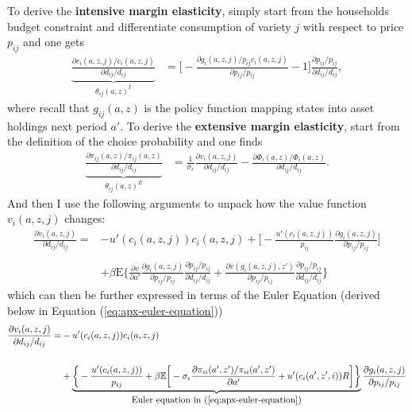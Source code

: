 \documentclass[12pt,pdftex]{article}
\begin{document}
\begin{onehalfspacing}
To derive the \textbf{intensive margin elasticity}, simply start from the households budget constraint and differentiate consumption of variety $j$ with respect to price $p_{ij}$ and one gets
\begin{align}
\underbrace{\frac{\partial c_{i}(a,z,j)/ c_{i}(a,z,j)}{\partial d_{ij} / d_{ij}}}_{\theta_{ij}(a,z)^{I}} &= \bigg [-\frac{\partial g_{i}(a,z,j)/ p_{ij}c_{i}(a,z,j)}{\partial p_{ij}/ p_{ij}} - 1 \bigg ]\frac{\partial p_{ij}/p_{ij}}{\partial d_{ij}/ d_{ij}} ,
\label{eq:apx-intensive-margin}
\end{align}
where recall that $g_{ij}(a,z)$ is the policy function mapping states into asset holdings next period $a'$. To derive the \textbf{extensive margin elasticity}, start from the definition of the choice probability and one finds
\begin{align}
\underbrace{ \frac{\partial \pi_{ij}(a,z) / \pi_{ij}(a,z)}{\partial d_{ij} / d_{ij}} }_{\theta_{ij}(a,z)^{E}} &= \frac{1}{\sigma_{\epsilon}}\frac{\partial v_{i}(a, z, j)}{\partial d_{ij}/d_{ij}} -  \frac{\partial \Phi_{i}(a,z) / \Phi_{i}(a,z)}{\partial d_{ij}/d_{ij}}.
\label{eq:apx-extensive-margin}
\end{align}
And then I use the following arguments to unpack how the value function $v_{i}(a, z, j)$ changes:
\begin{align}
\frac{\partial v_{i}(a,z,j)}{\partial d_{ij}/d_{ij}}  =& -u'(c_{i}(a,z,j))c_{i}(a,z,j) + \bigg [ -\frac{u'(c_{i}(a,z,j))}{p_{ij}}\frac{\partial g_{i}(a,z,j)}{\partial p_{ij}/ p_{ij}} \bigg ]  \\
\nonumber \\
&+ \beta \mathrm{E} \bigg \{\frac{\partial v}{\partial a'}\frac{\partial g_{i}(a,z,j)}{\partial p_{ij}/ p_{ij}}\frac{ \partial p_{ij}/ p_{ij}}{\partial d_{ij}/ d_{ij}} +  \frac{\partial v(g_{i}(a,z,j),z')}{\partial p_{ij}/ p_{ij}}\frac{ \partial p_{ij}/ p_{ij}}{\partial d_{ij}/ d_{ij}} \bigg \}
\end{align}
which can then be further expressed in terms of the Euler Equation (derived below in Equation (\ref{eq:apx-euler-equation}))
\begin{align}
\frac{\partial v_{i}(a,z,j)}{\partial d_{ij}/d_{ij}}  =& -u'(c_{i}(a,z,j))c_{i}(a,z,j) \label{eq:apx-first-term}\\
\nonumber \\
&+ \underbrace{\bigg \{ -\frac{u'(c_{i}(a,z,j))}{p_{ij}} + \beta \mathbb{E} \bigg [ -\sigma_{\epsilon} \frac{\partial \pi_{ii}(a',z') / \pi_{ii}(a',z')}{\partial a'} + u'(c_{i}(a',z',i))R \bigg ] \bigg \} }_{\mbox{Euler equation in (\ref{eq:apx-euler-equation})}} \frac{\partial g_{i}(a,z,j)}{\partial p_{ij}/ p_{ij}} \\

\end{align}
\end{onehalfspacing}
\end{document}
